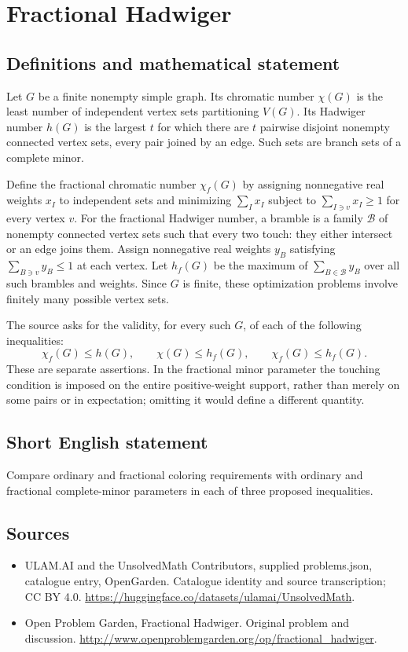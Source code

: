 \documentclass[11pt,a4paper]{article}
\begin{document}
\section*{Fractional Hadwiger}\label{statement}

\subsection{Definitions and mathematical statement}
Let $G$ be a finite nonempty simple graph. Its chromatic number $\chi(G)$ is the least number of independent vertex sets partitioning $V(G)$. Its Hadwiger number $h(G)$ is the largest $t$ for which there are $t$ pairwise disjoint nonempty connected vertex sets, every pair joined by an edge. Such sets are branch sets of a complete minor.

Define the fractional chromatic number $\chi_f(G)$ by assigning nonnegative real weights $x_I$ to independent sets and minimizing $\sum_Ix_I$ subject to $\sum_{I\ni v}x_I\ge1$ for every vertex $v$. For the fractional Hadwiger number, a bramble is a family $\mathcal B$ of nonempty connected vertex sets such that every two touch: they either intersect or an edge joins them. Assign nonnegative real weights $y_B$ satisfying $\sum_{B\ni v}y_B\le1$ at each vertex. Let $h_f(G)$ be the maximum of $\sum_{B\in\mathcal B}y_B$ over all such brambles and weights. Since $G$ is finite, these optimization problems involve finitely many possible vertex sets.

The source asks for the validity, for every such $G$, of each of the following inequalities:
\[
 \chi_f(G)\le h(G),\qquad
 \chi(G)\le h_f(G),\qquad
 \chi_f(G)\le h_f(G).
\]
These are separate assertions. In the fractional minor parameter the touching condition is imposed on the entire positive-weight support, rather than merely on some pairs or in expectation; omitting it would define a different quantity.
\subsection{Short English statement}
Compare ordinary and fractional coloring requirements with ordinary and fractional complete-minor parameters in each of three proposed inequalities.
\subsection{Sources}
\begin{itemize}
\item[S1] ULAM.AI and the UnsolvedMath Contributors, supplied problems.json, catalogue entry, OpenGarden. Catalogue identity and source transcription; CC BY 4.0.
\url{https://huggingface.co/datasets/ulamai/UnsolvedMath}.
\item[S2] Open Problem Garden, Fractional Hadwiger. Original problem and discussion.
\url{http://www.openproblemgarden.org/op/fractional_hadwiger}.
\end{itemize}
\end{document}
